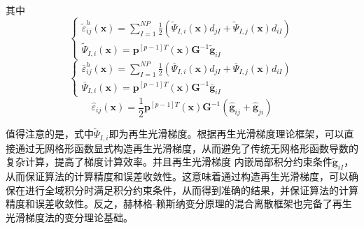 其中
\begin{equation}
\begin{cases}\label{case1}
    \tilde{\varepsilon}^h_{ij}(\pmb{x})=\displaystyle\sum_{I=1}^{N\!P}\frac{1}{2}(\tilde{\Psi}_{I,i}(\pmb{x})d_{jI}+\tilde{\Psi}_{I,j}(\pmb{x})d_{iI})\\
    \tilde{\Psi}_{I,i}(\pmb{x})=\pmb{p}^{[p-1]T}(\pmb{x})\pmb{G}^{-1}\tilde{\pmb g}_{iI}
\end{cases}
\end{equation}
\begin{equation}
\begin{cases}\label{case2}
    \bar{\varepsilon}^h_{ij}(\pmb{x})=\displaystyle\sum_{I=1}^{N\!P}\frac{1}{2}(\bar{\Psi}_{I,i}(\pmb{x})d_{jI}+\bar{\Psi}_{I,j}(\pmb{x})d_{iI})\\
    \bar{\Psi}_{I,i}(\pmb{x})=\pmb{p}^{[p-1]T}(\pmb{x})\pmb{G}^{-1}\bar{\pmb g}_{iI}
\end{cases}
\end{equation}
\begin{equation}\label{case3}
    \hat{\varepsilon}_{ij}(\pmb{x})=\frac{1}{2}\pmb{p}^{[p-1]T}(\pmb{x})\pmb{G}^{-1}(\hat{\pmb g}_{ij}+\hat{\pmb g}_{ji})
\end{equation} \par
值得注意的是，式中$\tilde{\Psi}_{I,i}$即为再生光滑梯度\cite{wang2019}。根据再生光滑梯度理论框架，可以直接通过无网格形函数显式构造再生光滑梯度，从而避免了传统无网格形函数导数的复杂计算，提高了梯度计算效率。并且再生光滑梯度
内嵌局部积分约束条件$\tilde{\pmb g}_{iI}$，从而保证算法的计算精度和误差收敛性。这意味着通过构造再生光滑梯度，可以确保在进行全域积分时满足积分约束条件，从而得到准确的结果，并保证算法的计算精度和误差收敛性。反之，赫林格-赖斯纳变分原理的混合离散框架也完备了再生光滑梯度法的变分理论基础。\par
